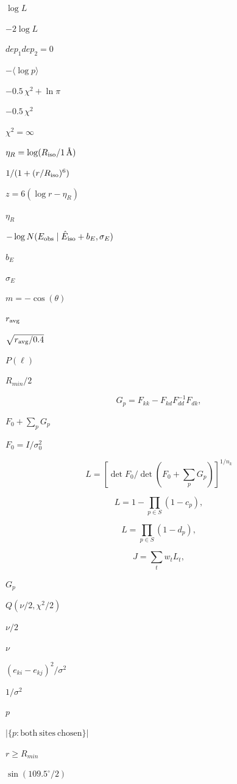 \documentclass{article}
\begin{document}
$\log L$
\pagebreak

$-2\log L$
\pagebreak

$dep_1 dep_2 = 0$
\pagebreak

$-\langle\log p\rangle$
\pagebreak

$-0.5\,\chi^2 + \ln\pi$
\pagebreak

$-0.5\,\chi^2$
\pagebreak

$\chi^2=\infty$
\pagebreak

$\eta_R=\log(R_{\rm iso}/1\,\text{\AA})$
\pagebreak

$1/(1+(r/R_{\rm iso})^6)$
\pagebreak

$z=6(\log r-\eta_R)$
\pagebreak

$\eta_R$
\pagebreak

$-\log N(E_{\rm obs}\mid\hat E_{\rm iso}+b_E,\sigma_E)$
\pagebreak

$b_E$
\pagebreak

$\sigma_E$
\pagebreak

$m=-\cos(\theta)$
\pagebreak

$r_{\rm avg}$
\pagebreak

$\sqrt{r_{\rm avg}/0.4}$
\pagebreak

$P(\ell)$
\pagebreak

$R_{min}/2$
\pagebreak

\[ G_p = F_{kk} - F_{kd} F_{dd}^{-1} F_{dk}, \]
\pagebreak

$F_0 + \sum_p G_p$
\pagebreak

$F_0 = I / \sigma_0^2$
\pagebreak

\[ L = \left[\det F_0 / \det(F_0 + \sum_p G_p)\right]^{1/n_k} \]
\pagebreak

\[ L = 1 - \prod_{p \in S} (1 - c_p), \]
\pagebreak

\[ L = \prod_{p \in S} (1 - d_p), \]
\pagebreak

\[ J = \sum_t w_t L_t, \]
\pagebreak

$G_p$
\pagebreak

$Q(\nu/2, \chi^2/2)$
\pagebreak

$\nu/2$
\pagebreak

$\nu$
\pagebreak

$(e_{ki} - e_{kj})^2 / \sigma^2$
\pagebreak

$1/\sigma^2$
\pagebreak

$p$
\pagebreak

$|\{p : \mathrm{both\ sites\ chosen}\}|$
\pagebreak

$r \ge R_{min}$
\pagebreak

$\sin(109.5^\circ / 2)$
\pagebreak
\end{document}
